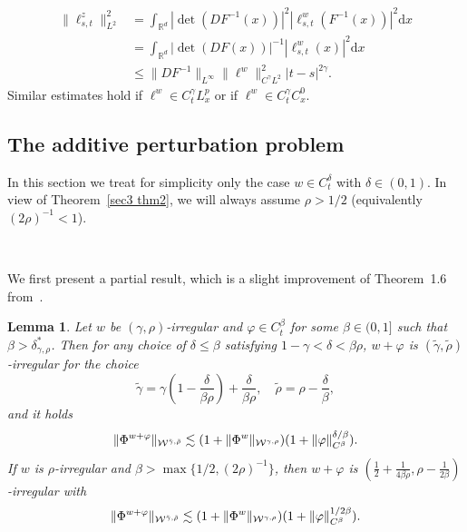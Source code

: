 \documentclass[10pt]{article}
\newcommand{\comma}{{,}}
\newcommand{\mathd}{\mathrm{d}}
\newcommand{\tmcolor}[2]{{\color{#1}{#2}}}
\newtheorem{lemma}[theorem]{Lemma}
\begin{document}
\begin{align*}
  \| \ell^z_{s, t} \|_{L^2}^2 & = \int_{\mathbb{R}^d} | \det (D F^{- 1} (x))
  |^2  | \ell^w_{s, t} (F^{- 1} (x)) |^2 \mathd x\\
  & = \int_{\mathbb{R}^d} | \det (D F (x)) |^{- 1}  | \ell^w_{s, t} (x) |^2
  \mathd x\\
  & \leqslant \| D F^{- 1} \|_{L^{\infty}}  \| \ell^w \|^2_{C^{\gamma} L^2} |
  t - s |^{2 \gamma} .
\end{align*}
%
Similar estimates hold if $\ell^w \in C^{\gamma}_t L^p_x$ or if $\ell^w \in
C^{\gamma}_t C^0_x$.

\subsection{The additive perturbation problem}\label{sec5.3.1}

In this section we treat for simplicity only the case $w \in C^{\delta}_t$
with $\delta \in (0, 1)$. In view of Theorem~\ref{sec3 thm2}, we will always
assume $\rho > 1 / 2$ (equivalently $(2 \rho)^{- 1} < 1$).

\

We first present a partial result, which is a slight improvement of
Theorem~1.6 from~{\cite{catelliergubinelli}}.

\begin{lemma}
  \label{sec5.3 lemma additive perturbation}Let $w$ be $(\gamma,
  \rho)$\mbox{-}irregular and $\varphi \in C_t^{\beta}$ for some $\beta \in
  (0, 1]$ such that $\beta > \delta^{\ast}_{\gamma, \rho}$. Then for any
  choice of $\delta \leqslant \beta$ satisfying $1 - \gamma < \delta < \beta
  \rho$, $w + \varphi$ is $(\tilde{\gamma}, \tilde{\rho})$\mbox{-}irregular
  for the choice
  \begin{equation}
    \tilde{\gamma} = \gamma \left( 1 - \frac{\delta}{\beta \rho} \right) +
    \frac{\delta}{\beta \rho}, \quad \tilde{\rho} = \rho -
    \frac{\delta}{\beta}, \label{sec5.3 parameters additive perturbation}
  \end{equation}
  and it holds
  \[ \tmcolor{black}{\| \Phi^{w + \varphi} \|_{\mathcal{W}^{\tilde{\gamma}
     \comma \tilde{\rho}}} \lesssim (1 + \| \Phi^w \|_{\mathcal{W}^{\gamma
     \comma \rho}}) (1 + \| \varphi \|^{\delta / \beta}_{C^{\beta}}) .} \]
  If $w$ is $\rho$-irregular and $\beta > \max \{ 1 / 2, (2 \rho)^{- 1} \}$,
  then $w + \varphi$ is $\left( \frac{1}{2} + \frac{1}{4 \beta \rho}, \rho -
  \frac{1}{2 \beta} \right)$\mbox{-}irregular with
  \[ \tmcolor{black}{\| \Phi^{w + \varphi} \|_{\mathcal{W}^{\tilde{\gamma}
     \comma \tilde{\rho}}} \lesssim (1 + \| \Phi^w \|_{\mathcal{W}^{\gamma
     \comma \rho}}) (1 + \| \varphi \|^{1 / 2 \beta}_{C^{\beta}}) .} \]
\end{lemma}
\end{document}
